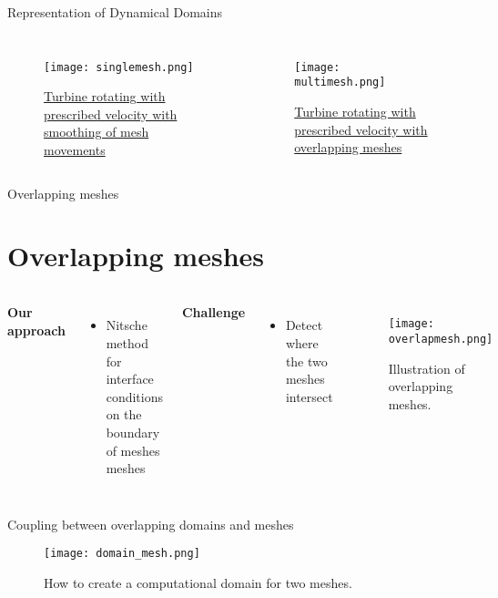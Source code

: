 \documentclass[mathserif]{beamer}
\begin{document}
\begin{frame}{Representation of Dynamical Domains}
  \begin{columns}
    \begin{figure}
      \texttt{[image: singlemesh.png]}
      \caption{\href{./singlemovie.avi}{Turbine rotating with prescribed velocity with smoothing of mesh movements}}
      
    \end{figure}

    \begin{figure}
      \texttt{[image: multimesh.png]}
      \caption{\href{./multimovie.avi}{Turbine rotating with prescribed velocity with overlapping meshes}}
    \end{figure}
  \end{columns}
  
  
\end{frame}
 
\begin{frame}{Overlapping meshes\section{Overlapping meshes}}
  \begin{columns}
    \textbf{Our approach}
    \begin{itemize}
    \item Nitsche method for interface conditions on the boundary of meshes meshes 
    \end{itemize}
    \textbf{Challenge}
    \begin{itemize}
    \item Detect where the two meshes intersect
    \end{itemize}
    \begin{figure}
      \centering
      \texttt{[image: overlapmesh.png]}
      \caption{Illustration of overlapping meshes.}
    \end{figure}
  \end{columns}
\end{frame}


\begin{frame}{Coupling between overlapping domains and meshes}
  \begin{figure}
    \centering
    \texttt{[image: domain\_mesh.png]}
    \caption{How to create a computational domain for two meshes.}
  \end{figure} 
\end{frame}
\end{document}
